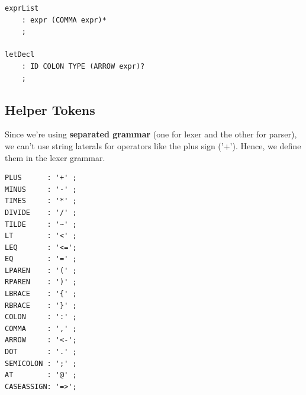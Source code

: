 \documentclass[titlepage]{article}
\begin{document}
\begin{lstlisting}[basicstyle=\ttfamily]
exprList                                                                                                   
    : expr (COMMA expr)*                                                                                   
    ;                                                                                                      
                                                                                                           
letDecl
    : ID COLON TYPE (ARROW expr)?
    ;                                                                                                    
\end{lstlisting}

\newpage
\subsection{Helper Tokens}

Since we're using \textbf{separated grammar} (one for lexer and the other for parser), we can't use string laterals for operators like the plus sign ('+'). Hence, we define them in the lexer grammar.

\begin{lstlisting}[basicstyle=\ttfamily]
PLUS      : '+' ;
MINUS     : '-' ;
TIMES     : '*' ;
DIVIDE    : '/' ;
TILDE     : '~' ;
LT        : '<' ;
LEQ       : '<=';
EQ        : '=' ;
LPAREN    : '(' ;
RPAREN    : ')' ;
LBRACE    : '{' ;
RBRACE    : '}' ;
COLON     : ':' ;
COMMA     : ',' ;
ARROW     : '<-';
DOT       : '.' ;
SEMICOLON : ';' ;
AT        : '@' ;
CASEASSIGN: '=>';
\end{lstlisting}
\end{document}
